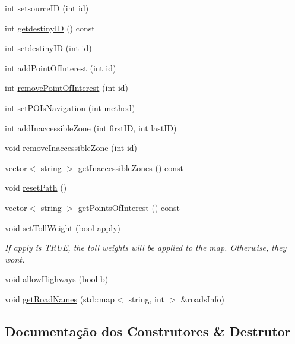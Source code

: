 \begin{DoxyCompactItemize}
int \hyperlink{class_easy_pilot_a883991b124225932e5b683c2d09ce464}{setsource\+I\+D} (int id)
\item 
int \hyperlink{class_easy_pilot_acd4716401c9b31adcc121311361f516d}{getdestiny\+I\+D} () const 
\item 
int \hyperlink{class_easy_pilot_a16a15fa19114daf0b59a40f976fcc5a1}{setdestiny\+I\+D} (int id)
\item 
int \hyperlink{class_easy_pilot_a66c58ddfc69633955e44f81ed206a7c9}{add\+Point\+Of\+Interest} (int id)
\item 
int \hyperlink{class_easy_pilot_a24988647f06c8ebfb208775e491a2549}{remove\+Point\+Of\+Interest} (int id)
\item 
int \hyperlink{class_easy_pilot_a462212efecccb55922602dda01f35e01}{set\+P\+O\+Is\+Navigation} (int method)
\item 
int \hyperlink{class_easy_pilot_aaf295c560bda9154e7246b22525d44f7}{add\+Inaccessible\+Zone} (int first\+I\+D, int last\+I\+D)
\item 
void \hyperlink{class_easy_pilot_a317650cbaa0b9d460bb3298b6b75ac40}{remove\+Inaccessible\+Zone} (int id)
\item 
vector$<$ string $>$ \hyperlink{class_easy_pilot_a5421dd20a6a8a5f29014087fd8323b62}{get\+Inaccessible\+Zones} () const 
\item 
void \hyperlink{class_easy_pilot_a74db0871ef17ad333bf22d8b261fbe2f}{reset\+Path} ()
\item 
vector$<$ string $>$ \hyperlink{class_easy_pilot_a07b3d6386b5e59df00df536c123d56fb}{get\+Points\+Of\+Interest} () const 
\item 
void \hyperlink{class_easy_pilot_aaed66da7454f6181e445f0219ceda0bb}{set\+Toll\+Weight} (bool apply)
\begin{DoxyCompactList}\small\item\em If apply is T\+R\+U\+E, the toll weights will be applied to the map. Otherwise, they won\textquotesingle{}t. \end{DoxyCompactList}\item 
void \hyperlink{class_easy_pilot_ad7a6abdd782c33e553b0fa08d2119d8b}{allow\+Highways} (bool b)
\item 
void \hyperlink{class_easy_pilot_a0711a7d369215006690e6265a34f092b}{get\+Road\+Names} (std\+::map$<$ string, int $>$ \&roads\+Info)
\end{DoxyCompactItemize}


\subsection{Documentação dos Construtores \& Destrutor}
\hypertarget{class_easy_pilot_a724cc31f52fb07f5f86a3f71592ceed6}{}
